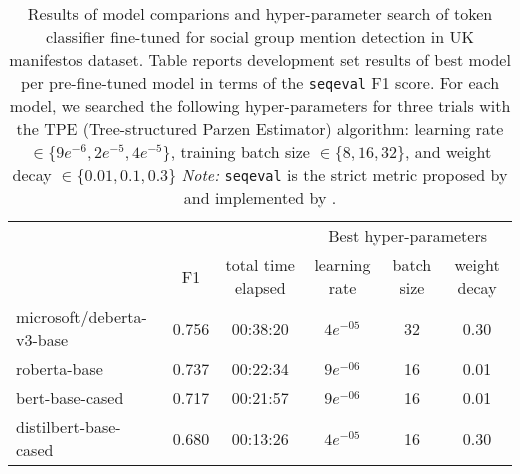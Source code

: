 \begin{table}[!h]

\caption{\label{tab:uk-manifestos_model-comparison}Results of model comparions and hyper-parameter search of token classifier fine-tuned for social group mention detection in UK manifestos dataset. Table reports development set results of best model per pre-fine-tuned model in terms of the \texttt{seqeval} F1 score. For each model, we searched the following hyper-parameters for three trials with the TPE (Tree-structured Parzen Estimator) algorithm: learning rate $\in \{9e^{-6}, 2e^{-5}, 4e^{-5}\}$, training batch size $\in \{8, 16, 32\}$, and weight decay $\in \{0.01, 0.1, 0.3\}$ \emph{Note:} \texttt{seqeval} is the strict metric proposed by \citet{ramshaw_text_1995} and implemented by \citet{nakayama_seqeval_2018}.}
\centering
\fontsize{10}{12}\selectfont
\begin{tabular}[t]{lccccc}
\toprule
\multicolumn{3}{c}{ } & \multicolumn{3}{c}{Best hyper-parameters} \\
\cmidrule(l{3pt}r{3pt}){4-6}
  & F1 & total time elapsed & learning rate & batch size & weight decay\\
\midrule
microsoft/deberta-v3-base & 0.756 & 00:38:20 & $4e^{-05}$ & 32 & 0.30\\
roberta-base & 0.737 & 00:22:34 & $9e^{-06}$ & 16 & 0.01\\
bert-base-cased & 0.717 & 00:21:57 & $9e^{-06}$ & 16 & 0.01\\
distilbert-base-cased & 0.680 & 00:13:26 & $4e^{-05}$ & 16 & 0.30\\
\bottomrule
\end{tabular}
\end{table}
